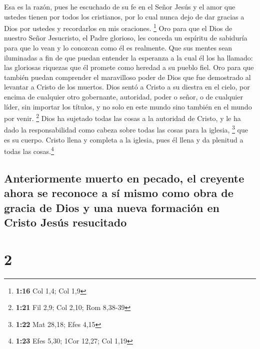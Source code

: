  Esa es la razón, pues he escuchado de su fe en el Señor
Jesús y el amor que ustedes tienen por todos los cristianos,
 por lo cual nunca dejo de dar gracias a Dios por ustedes
y recordarlos en mis oraciones. \footnote{\textbf{1:16} Col 1,4; Col 1,9}
 Oro para que el Dios de nuestro Señor Jesucristo, el
Padre glorioso, les conceda un espíritu de sabiduría para que lo vean y
lo conozcan como él es realmente.  Que sus mentes sean
iluminadas a fin de que puedan entender la esperanza a la cual él los ha
llamado:  las gloriosas riquezas que él promete como
heredad a su pueblo fiel. Oro para que también puedan comprender el
maravilloso poder de Dios  que fue demostrado al levantar
a Cristo de los muertos. Dios sentó a Cristo a su diestra en el cielo,
 por encima de cualquier otro gobernante, autoridad,
poder o señor, o de cualquier líder, sin importar los títulos, y no solo
en este mundo sino también en el mundo por venir. \footnote{\textbf{1:21}
  Fil 2,9; Col 2,10; Rom 8,38-39}  Dios ha sujetado todas
las cosas a la autoridad de Cristo, y le ha dado la responsabilidad como
cabeza sobre todas las cosas para la iglesia, \footnote{\textbf{1:22}
  Mat 28,18; Efes 4,15}  que es su cuerpo. Cristo llena y
completa a la iglesia, pues él llena y da plenitud a todas las
cosas.\footnote{\textbf{1:23} Efes 5,30; 1Cor 12,27; Col 1,19}

\hypertarget{anteriormente-muerto-en-pecado-el-creyente-ahora-se-reconoce-a-suxed-mismo-como-obra-de-gracia-de-dios-y-una-nueva-formaciuxf3n-en-cristo-jesuxfas-resucitado}{%
\subsection{Anteriormente muerto en pecado, el creyente ahora se
reconoce a sí mismo como obra de gracia de Dios y una nueva formación en
Cristo Jesús
resucitado}\label{anteriormente-muerto-en-pecado-el-creyente-ahora-se-reconoce-a-suxed-mismo-como-obra-de-gracia-de-dios-y-una-nueva-formaciuxf3n-en-cristo-jesuxfas-resucitado}}

\hypertarget{section-1}{%
\section{2}\label{section-1}}

